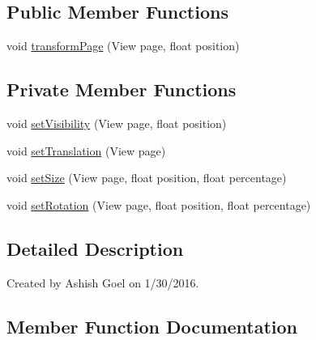 \subsection*{Public Member Functions}
\begin{DoxyCompactItemize}
\item 
void \hyperlink{classorg_1_1buildmlearn_1_1learnwithflashcards_1_1animations_1_1FlipPageTransformer_a3ec62d470e2bc19082588035eb919032}{transform\+Page} (View page, float position)
\end{DoxyCompactItemize}
\subsection*{Private Member Functions}
\begin{DoxyCompactItemize}
\item 
void \hyperlink{classorg_1_1buildmlearn_1_1learnwithflashcards_1_1animations_1_1FlipPageTransformer_a38ac6c7410c51c48f9098f559164f6a2}{set\+Visibility} (View page, float position)
\item 
void \hyperlink{classorg_1_1buildmlearn_1_1learnwithflashcards_1_1animations_1_1FlipPageTransformer_a14cac1a790c09082788e6c2167a7b4fb}{set\+Translation} (View page)
\item 
void \hyperlink{classorg_1_1buildmlearn_1_1learnwithflashcards_1_1animations_1_1FlipPageTransformer_ad478a5a57427ad6906dfb854b7b2042d}{set\+Size} (View page, float position, float percentage)
\item 
void \hyperlink{classorg_1_1buildmlearn_1_1learnwithflashcards_1_1animations_1_1FlipPageTransformer_abd33a77ba78992cf2ed05ac422eb0383}{set\+Rotation} (View page, float position, float percentage)
\end{DoxyCompactItemize}


\subsection{Detailed Description}
Created by Ashish Goel on 1/30/2016. 

\subsection{Member Function Documentation}

